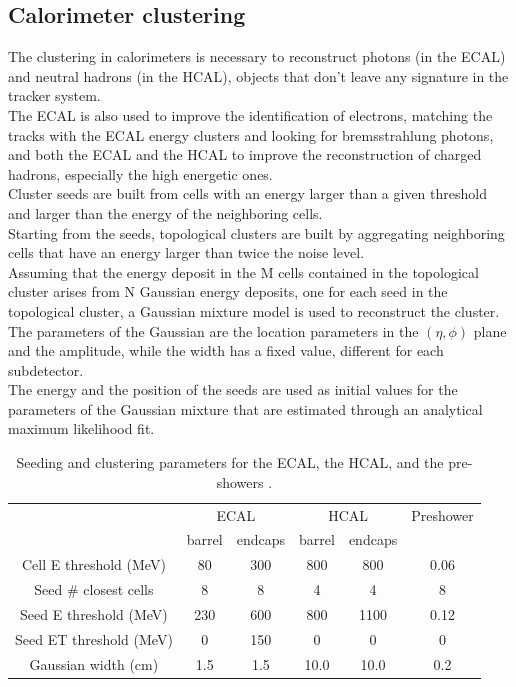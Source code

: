 \subsection{Calorimeter clustering}
The clustering in calorimeters is necessary to reconstruct photons (in the ECAL) and neutral hadrons (in the HCAL), objects that don't leave any signature in the tracker system.\\
The ECAL is also used to improve the identification of electrons, matching the tracks with the ECAL energy clusters and looking for bremsstrahlung photons, and both the ECAL and the HCAL to improve the reconstruction of charged hadrons, especially the high energetic ones.\\
Cluster seeds are built from cells with an energy larger than a given threshold and
larger than the energy of the neighboring cells.\\
Starting from the seeds, topological clusters are built by aggregating neighboring cells that have an energy larger than twice the noise level.\\
Assuming that the energy deposit in the M cells contained in the topological cluster arises from N Gaussian energy deposits, one for each seed in the topological cluster, a Gaussian mixture model is used to reconstruct the cluster. The parameters of the Gaussian are the location parameters in the $(\eta,\phi)$ plane and the amplitude, while the width has a fixed value, different for each subdetector.\\
The energy and the position of the seeds are used as initial values for the parameters of the Gaussian mixture that are estimated through an analytical maximum likelihood fit.\\

\begin{table}[h!]
    \centering
    \begin{tabular}{|c|cc|cc|c|}
    \hline
    &\multicolumn{2}{c|}{ECAL} & \multicolumn{2}{c|}{HCAL} & Preshower\\
    &barrel&endcaps&barrel&endcaps& \\
    \hline
    Cell E threshold (MeV)&80&300&800&800&0.06\\
    Seed \# closest cells&8&8&4&4&8\\
    Seed E threshold (MeV)&230&600&800&1100&0.12\\
    Seed ET threshold (MeV)&0&150&0&0&0\\
    Gaussian width (cm)&1.5&1.5&10.0&10.0&0.2\\
    \hline
    \end{tabular}
    \caption{Seeding and clustering parameters for the ECAL, the HCAL, and the pre-showers \cite{Sirunyan2017Particle-flowDetector}.}
    \label{tab:clustering}
\end{table}

